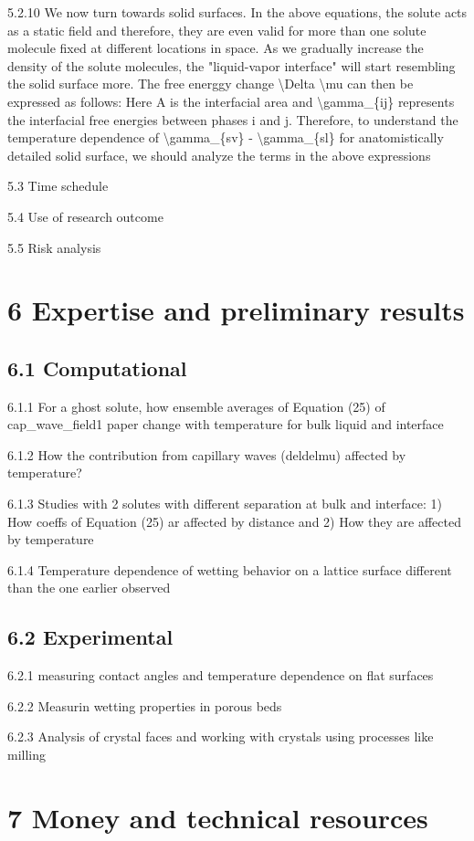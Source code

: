 \par 5.2.10  We now turn towards solid surfaces. In the above equations, the solute acts as a static field and therefore, they are even valid for more than one solute molecule fixed at different locations in space. As we gradually increase the density of the solute molecules, the "liquid-vapor interface" will start  resembling the solid surface more. The free energgy change \textbackslash Delta \textbackslash mu can then be expressed as follows: Here A is the interfacial area and \textbackslash gamma\_\{ij\} represents the interfacial free energies between phases i and j. Therefore, to understand the temperature dependence of \textbackslash gamma\_\{sv\} - \textbackslash gamma\_\{sl\} for anatomistically detailed solid surface, we should analyze the terms in the above expressions
\par 5.3 Time schedule
\par 5.4 Use of research outcome
\par 5.5 Risk analysis\section{6 Expertise and preliminary results}
\subsection{6.1 Computational}

\par 6.1.1 For a ghost solute, how ensemble averages of Equation (25) of cap\_wave\_field1 paper change with temperature for bulk liquid and interface
\par 6.1.2 How the contribution from capillary waves (deldelmu) affected by temperature?
\par 6.1.3 Studies with 2 solutes with different separation at bulk and interface: 1) How coeffs of Equation (25) ar affected by distance and 2) How they are affected by temperature
\par 6.1.4 Temperature dependence of wetting behavior on a lattice surface different than the one earlier observed\subsection{6.2 Experimental}

\par 6.2.1 measuring contact angles and temperature dependence on flat surfaces
\par 6.2.2 Measurin wetting properties in porous beds
\par 6.2.3 Analysis of crystal faces and working with crystals using processes like milling\section{7 Money and technical resources}
